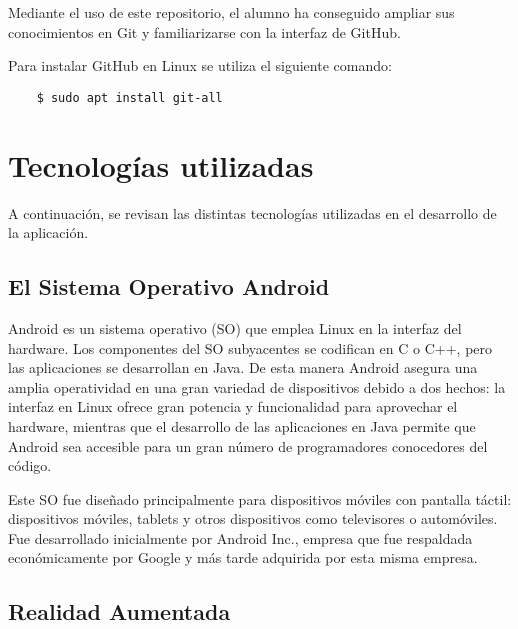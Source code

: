 Mediante el uso de este repositorio, el alumno ha conseguido ampliar sus conocimientos en Git y familiarizarse con la interfaz de GitHub.

Para instalar GitHub en Linux se utiliza el siguiente comando:
\begin{lstlisting}
    $ sudo apt install git-all
\end{lstlisting}

\section{Tecnologías utilizadas}

A continuación, se revisan las distintas tecnologías utilizadas en el desarrollo de la aplicación.

\subsection{El Sistema Operativo Android}

Android \cite{URL::Android} es un sistema operativo (SO) que emplea Linux en la interfaz del hardware.  Los componentes del SO subyacentes se codifican en C o C++, pero las aplicaciones se desarrollan en Java. De esta manera Android asegura una amplia operatividad en una gran variedad de dispositivos debido a dos hechos: la interfaz en Linux ofrece gran potencia y funcionalidad para aprovechar el hardware, mientras que el desarrollo de las aplicaciones en Java permite que Android sea accesible para un gran número de programadores conocedores del código.

Este SO fue diseñado principalmente para dispositivos móviles con pantalla táctil: dispositivos móviles, tablets y otros dispositivos como televisores o automóviles. Fue desarrollado inicialmente por Android Inc., empresa que fue respaldada económicamente por Google y más tarde adquirida por esta misma empresa.


\subsection{Realidad Aumentada}

